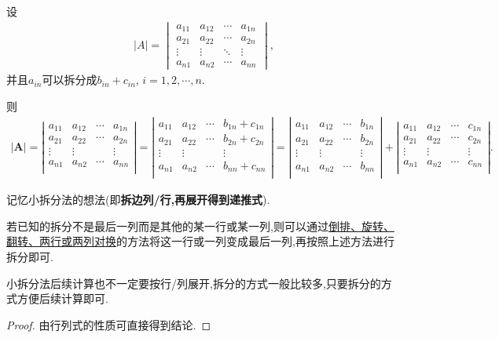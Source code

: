 \documentclass[../../main.tex]{subfiles}%
\begin{document}
\begin{proposition}\label{小拆分法}
设
\begin{align*}
|A| = 
\begin{vmatrix}
a_{11} & a_{12} & \cdots & a_{1n} \\
a_{21} & a_{22} & \cdots & a_{2n} \\
\vdots & \vdots & \ddots & \vdots \\
a_{n1} & a_{n2} & \cdots & a_{nn}
\end{vmatrix},
\nonumber
\end{align*}
并且$a_{in}$可以拆分成$b_{in}+c_{in}$,$\,\,i=1,2,\cdots,n.$

则
\begin{align*}
\left| \boldsymbol{A} \right|=\left| \begin{matrix}
a_{11}&		a_{12}&		\cdots&		a_{1n}\\
a_{21}&		a_{22}&		\cdots&		a_{2n}\\
\vdots&		\vdots&		&		\vdots\\
a_{n1}&		a_{n2}&		\cdots&		a_{nn}\\
\end{matrix} \right|=\left| \begin{matrix}
a_{11}&		a_{12}&		\cdots&		b_{1n}+c_{1n}\\
a_{21}&		a_{22}&		\cdots&		b_{2n}+c_{2n}\\
\vdots&		\vdots&		&		\vdots\\
a_{n1}&		a_{n2}&		\cdots&		b_{nn}+c_{nn}\\
\end{matrix} \right|=\left| \begin{matrix}
a_{11}&		a_{12}&		\cdots&		b_{1n}\\
a_{21}&		a_{22}&		\cdots&		b_{2n}\\
\vdots&		\vdots&		&		\vdots\\
a_{n1}&		a_{n2}&		\cdots&		b_{nn}\\
\end{matrix} \right|+\left| \begin{matrix}
a_{11}&		a_{12}&		\cdots&		c_{1n}\\
a_{21}&		a_{22}&		\cdots&		c_{2n}\\
\vdots&		\vdots&		&		\vdots\\
a_{n1}&		a_{n2}&		\cdots&		c_{nn}\\
\end{matrix} \right|.
\end{align*}
\end{proposition}
\begin{note}
记忆小拆分法的想法(即\textbf{拆边列/行,再展开得到递推式}).
\end{note}
\begin{remark}
若已知的拆分不是最后一列而是其他的某一行或某一列,则可以通过\hyperref[proposition:行列式计算常识]{倒排、旋转、翻转、两行或两列对换}的方法将这一行或一列变成最后一列,再按照上述方法进行拆分即可.

小拆分法后续计算也不一定要按行/列展开,拆分的方式一般比较多,只要拆分的方式方便后续计算即可. 
\end{remark}
\begin{proof}
由行列式的性质可直接得到结论.
\end{proof}
\end{document}
